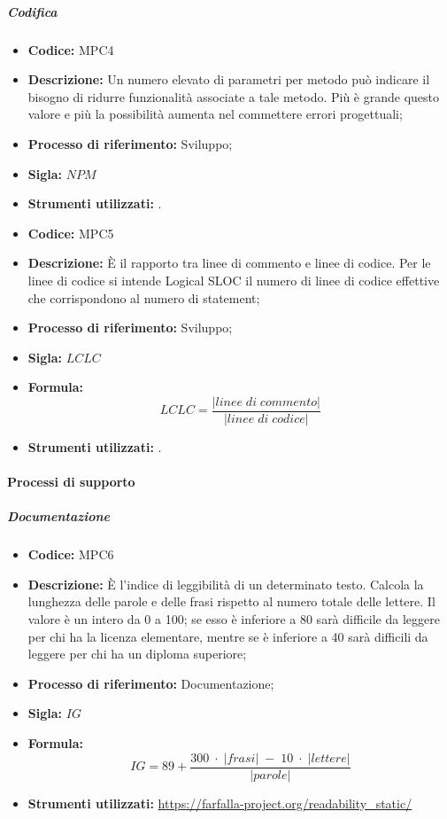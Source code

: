 \subparagraph{Codifica}
    \begin{itemize}
        \item \textbf{Codice:} MPC4
        \item \textbf{Descrizione:} Un numero elevato di parametri per metodo può indicare il bisogno di ridurre funzionalità associate a tale metodo. Più è grande questo valore e più la possibilità aumenta nel commettere errori progettuali;
        \item \textbf{Processo di riferimento:} Sviluppo;
        \item \textbf{Sigla:} $NPM$
        \item \textbf{Strumenti utilizzati:} .
    \end{itemize}

    \begin{itemize}
        \item \textbf{Codice:} MPC5
        \item \textbf{Descrizione:} È il rapporto tra linee di commento e linee di codice. Per le linee di codice si intende Logical SLOC il numero di linee di codice effettive che corrispondono al numero di statement;
        \item \textbf{Processo di riferimento:} Sviluppo;
        \item \textbf{Sigla:} $LCLC$
        \item \textbf{Formula:}$$LCLC = \frac{|linee \; di \; commento|}{|linee \; di \; codice|}$$
        \item \textbf{Strumenti utilizzati:} .
    \end{itemize}
\paragraph{Processi di supporto}
\subparagraph{Documentazione}
\begin{itemize}
	\item \textbf{Codice:} MPC6
	\item \textbf{Descrizione:} È l'indice di leggibilità di un determinato testo. Calcola la lunghezza delle parole e delle frasi rispetto al numero totale delle lettere. Il valore è un intero da 0 a 100; se esso è inferiore a 80 sarà difficile da leggere per chi ha la licenza elementare, mentre se è inferiore a 40 sarà difficili da leggere per chi ha un diploma superiore;
	\item \textbf{Processo di riferimento:} Documentazione;
	\item \textbf{Sigla:} $IG$
	\item \textbf{Formula:} $$IG = 89 + {\frac{300 \; \cdot \; |frasi| \; - \; 10 \; \cdot \; |lettere|}{|parole|}}$$
	\item \textbf{Strumenti utilizzati:} \url{https://farfalla-project.org/readability_static/}
\end{itemize}

